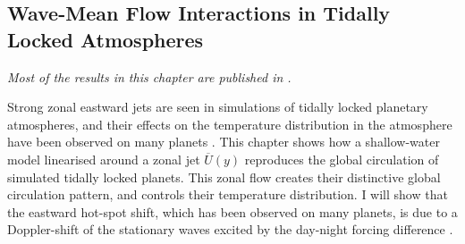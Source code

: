 \begin{SingleSpace}
\chapter{Wave-Mean Flow Interactions in Tidally Locked Atmospheres}\label{ch:wave-mean-flow}
\end{SingleSpace}

\noindent
 \vspace*{-0.5cm}
\textit{Most of the results in this chapter are published in \citet{hammond2018wavemean}.}
 \vspace*{0.5cm}



Strong zonal eastward jets are seen in simulations of tidally locked planetary atmospheres, and their effects on the temperature distribution in the atmosphere have been observed on many planets \citep{parmentier2017handbook}. This chapter shows how a shallow-water model linearised around a zonal jet $\overline{U}(y)$ reproduces the global circulation of simulated tidally locked planets. This zonal flow creates their distinctive global circulation pattern, and controls their temperature distribution. I will show that the eastward hot-spot shift, which has been observed on many planets, is due to a Doppler-shift of the stationary waves excited by the day-night forcing difference \citep{tsai2014three}.


